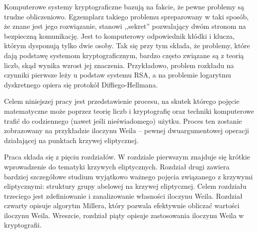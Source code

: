 Komputerowe systemy kryptograficzne bazują na fakcie,
że pewne problemy są trudne obliczeniowo.
Egzemplarz takiego problemu spreparowany w taki sposób,
że znane jest jego rozwiązanie,
stanowi ,,sekret'' pozwalający dwóm stronom na bezpieczną komunikację.
Jest to komputerowy odpowiednik kłódki i klucza,
którym dysponują tylko dwie osoby.
Tak się przy tym składa,
że problemy, które dają podstawę systemom kryptograficznym,
bardzo często związane są z teorią liczb,
skąd wynika wzrost jej znaczenia.
Przykładowo, problem rozkładu na czynniki pierwsze leży u podstaw systemu RSA,
a na problemie logarytmu dyskretnego opiera się protokół Diffiego-Hellmana.

Celem niniejszej pracy jest przedstawienie procesu,
na skutek którego pojęcie matematyczne
może poprzez teorię liczb i kryptografię oraz techniki komputerowe
trafić do codziennego (nawet jeśli nieświadomego) użytku.
Proces ten zostanie zobrazowany na przykładzie iloczynu Weila --
pewnej dwuargumentowej operacji
działającej na punktach krzywej eliptycznej.

Praca składa się z pięciu rozdziałów.
W rozdziale pierwszym znajduje się krótkie wprowadzenie
do tematyki krzywych eliptycznych.
Rozdział drugi zawiera bardziej szczegółowe studium
wyjątkowo ważnego pojęcia związanego z krzywymi eliptycznymi:
struktury grupy abelowej na krzywej eliptycznej.
Celem rozdziału trzeciego
jest zdefiniowanie i zanalizowanie własności iloczynu Weila.
Rozdział czwarty opisuje algorytm Millera,
który pozwala efektywnie obliczać wartości iloczynu Weila.
Wreszcie, rozdział piąty opisuje zastosowania iloczynu Weila w kryptografii.
